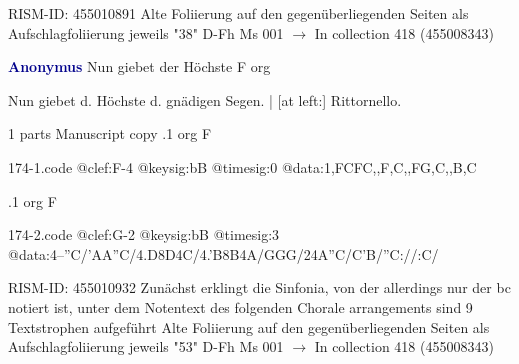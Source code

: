 \documentclass[twocolumn]{book}
\begin{document}
\newline RISM-ID: 455010891
\newline Alte Foliierung auf den gegenüberliegenden Seiten als Aufschlagfoliierung jeweils "38"
\newline D-Fh  Ms 001
\newline $\rightarrow$ In collection 418 (455008343)

\newline \par \vspace{7pt} \textcolor{darkblue}{\textbf{Anonymus  }}
\newline Nun giebet der Höchste  F  
\newline org
\newline \begin{itshape}[heading, f.61v:] Nun giebet d. Höchste d. gnädigen Segen. | [at left:] Rittornello.\end{itshape} 
\newline \textcolor{darkblue}{}  1 parts  
\newline Manuscript copy
.1  org  F  
\begin{filecontents*}{174-1.code}
@clef:F-4
@keysig:bB
@timesig:0
@data:1,FCFC,,F,C,,FG,C,,B,C
\end{filecontents*}
\newline
%

.1  org  F  
\begin{filecontents*}{174-2.code}
@clef:G-2
@keysig:bB
@timesig:3
@data:4--''C/'AA''C/4.D8D4C/4.'B8B4A/GGG/24A''C/C'B/''C://:C/
\end{filecontents*}
\newline
%

\newline RISM-ID: 455010932
\newline Zunächst erklingt die Sinfonia, von der allerdings nur der bc notiert ist, unter dem Notentext des folgenden Chorale arrangements sind 9 Textstrophen aufgeführt
\newline Alte Foliierung auf den gegenüberliegenden Seiten als Aufschlagfoliierung jeweils "53"
\newline D-Fh  Ms 001
\newline $\rightarrow$ In collection 418 (455008343)
\end{document}
